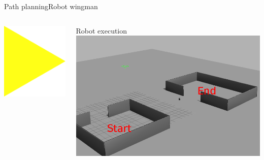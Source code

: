\begin{frame}{Path planning}{Robot wingman}
\begin{columns}
\begin{minipage}{\textwidth}
\centering
\includegraphics[width = \textwidth]{./figure/arrow2}
\end{minipage}

\begin{minipage}{\textwidth}
\begin{block}{Robot execution}
\centering
\includegraphics[width = \textwidth]{./figure/simulation/gazebo2.png}
\end{block}
\end{minipage}


\end{columns}

\end{frame}

